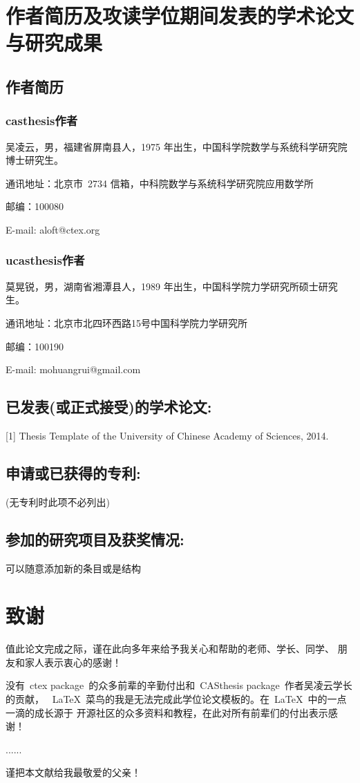 \chapter{作者简历及攻读学位期间发表的学术论文与研究成果}

\section*{作者简历}

\subsection*{casthesis作者}

吴凌云，男，福建省屏南县人，1975 年出生，中国科学院数学与系统科学研究院博士研究生。

通讯地址：北京市~2734 信箱，中科院数学与系统科学研究院应用数学所

邮编：100080

E-mail: aloft@ctex.org

\subsection*{ucasthesis作者}

莫晃锐，男，湖南省湘潭县人，1989 年出生，中国科学院力学研究所硕士研究生。

通讯地址：北京市北四环西路15号中国科学院力学研究所

邮编：100190

E-mail: mohuangrui@gmail.com

\section*{已发表(或正式接受)的学术论文:}

[1] Thesis Template of the University of Chinese Academy of Sciences, 2014.

\section*{申请或已获得的专利:}

(无专利时此项不必列出)

\section*{参加的研究项目及获奖情况:}

可以随意添加新的条目或是结构

\chapter{致\quad 谢}

值此论文完成之际，谨在此向多年来给予我关心和帮助的老师、学长、同学、
朋友和家人表示衷心的感谢！

没有~ctex package~的众多前辈的辛勤付出和~CASthesis package~作者吴凌云学长的贡献，
~\LaTeX{}~菜鸟的我是无法完成此学位论文模板的。在~\LaTeX{}~中的一点一滴的成长源于
开源社区的众多资料和教程，在此对所有前辈们的付出表示感谢！

......

谨把本文献给我最敬爱的父亲！
